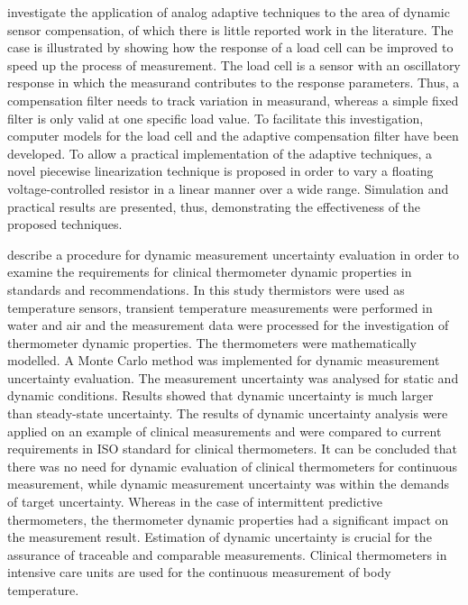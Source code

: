 \documentclass[11pt]{article}
\begin{document}
\citet{Jafaripanah05}  investigate the application of analog adaptive techniques to the area of dynamic sensor compensation, of which there is little reported work in the literature. The case is illustrated by showing how the response of a load cell can be improved to speed up the process of measurement. The load cell is a sensor with an oscillatory response in which the measurand contributes to the response parameters. Thus, a compensation filter needs to track variation in measurand, whereas a simple fixed filter is only valid at one specific load value. To facilitate this investigation, computer models for the load cell and the adaptive compensation filter have been developed. To allow a practical implementation of the adaptive techniques, a novel piecewise linearization technique is proposed in order to vary a floating voltage-controlled resistor in a linear manner over a wide range. Simulation and practical results are presented, thus, demonstrating the effectiveness of the proposed techniques.

\citet{Ogorevc16}  describe a procedure for dynamic measurement uncertainty evaluation in order to examine the requirements for clinical thermometer dynamic properties in standards and recommendations. In this study thermistors were used as temperature sensors, transient temperature measurements were performed in water and air and the measurement data were processed for the investigation of thermometer dynamic properties. The thermometers were mathematically modelled. A Monte Carlo method was implemented for dynamic measurement uncertainty evaluation. The measurement uncertainty was analysed for static and dynamic conditions. Results showed that dynamic uncertainty is much larger than steady-state uncertainty. The results of dynamic uncertainty analysis were applied on an example of clinical measurements and were compared to current requirements in ISO standard for clinical thermometers. It can be concluded that there was no need for dynamic evaluation of clinical thermometers for continuous measurement, while dynamic measurement uncertainty was within the demands of target uncertainty. Whereas in the case of intermittent predictive thermometers, the thermometer dynamic properties had a significant impact on the measurement result. Estimation of dynamic uncertainty is crucial for the assurance of traceable and comparable measurements.
Clinical thermometers in intensive care units are used for the continuous measurement of body temperature. 
\end{document}
